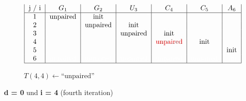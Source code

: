 \begin{figure}[H]
\begin{subfigure}[t]{0.65\textwidth}
\[\begin{tabular}{|c|c|c|c|c|c|c|}
                                    j / i & $G_1$    & $G_2$    & $U_3$    & $C_4$                     & $C_5$ & $A_6$ \\ \hline
                                    1     & unpaired & init     &          &                           &       &       \\
                                    2     &          & unpaired & init     &                           &       &       \\
                                    3     &          &          & unpaired & init                      &       &       \\
                                    4     &          &          &          & \textcolor{red}{unpaired} & init  &       \\
                                    5     &          &          &          &                           &       & init  \\
                                    6 & \textcolor{white}{unpaired} & \textcolor{white}{unpaired} & \textcolor{white}{unpaired}
                                    & \textcolor{white}{unpaired}
                                    & \textcolor{white}{unpaired}
                                    & \textcolor{white}{init}
                                    \\ \hline
                        \end{tabular}
        \]
        \caption{$T(4,4) \gets \text{``unpaired''}$ }
    \end{subfigure}
    \caption{\textbf{d = 0} und \textbf{i = 4} (fourth iteration)}\label{fig:figure21}

\end{figure}

